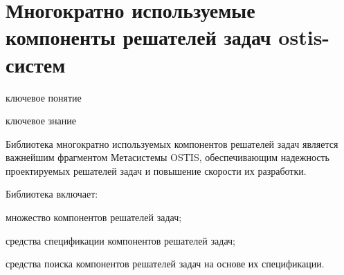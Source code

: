 \section{Многократно используемые компоненты решателей задач ostis-систем}
\begin{SCn}
\bigskip

\begin{scnrelfromlist}{ключевое понятие}
\end{scnrelfromlist}

\bigskip

\begin{scnrelfromlist}{ключевое знание}
\end{scnrelfromlist}
\end{SCn}
\label{ps_components_section}


Библиотека многократно используемых компонентов решателей задач является важнейшим фрагментом Метасистемы OSTIS, обеспечивающим надежность проектируемых решателей задач и повышение скорости их разработки.

Библиотека включает:
\begin{textitemize}
\item множество компонентов решателей задач;
\item средства спецификации компонентов решателей задач;
\item средства поиска компонентов решателей задач на основе их спецификации.
\end{textitemize}

